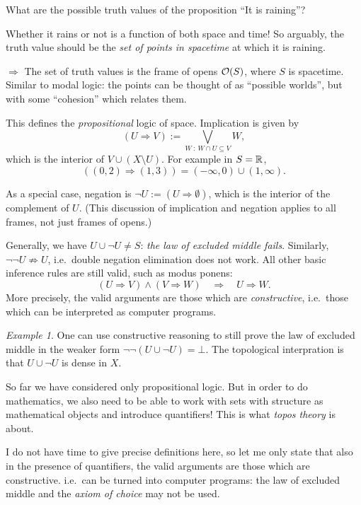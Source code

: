\documentclass[11pt, oneside, article]{memoir}
\theoremstyle{plain}
\theoremstyle{definition}
\theoremstyle{remark}
\newtheorem{example}[theorem]{Example}
\begin{document}
What are the possible truth values of the proposition ``It is raining''?

Whether it rains or not is a function of both space and time! So arguably, the truth value should be the \emph{set of points in spacetime} at which it is raining. 

$\Rightarrow$ The set of truth values is the frame of opens $\mathcal{O}(S)$, where $S$ is spacetime. Similar to modal logic: the points can be thought of as ``possible worlds'', but with some ``cohesion'' which relates them.

This defines the \emph{propositional} logic of space. Implication is given by
\[
	(U \Rightarrow V) := \bigvee_{W \: : \: W \cap U \subseteq V} W,
\]
which is the interior of $V\cup (X\setminus U)$. For example in $S = \mathbb{R}$,
\[
	((0,2) \Rightarrow (1,3)) = (-\infty, 0) \cup (1,\infty).
\]

As a special case, negation is $\lnot U := (U \Rightarrow \emptyset)$, which is the interior of the complement of $U$. (This discussion of implication and negation applies to all frames, not just frames of opens.)

Generally, we have $U \cup \lnot U \neq S$: \emph{the law of excluded middle fails}. Similarly, $\lnot\lnot U \not\Rightarrow U$, i.e.~double negation elimination does not work. All other basic inference rules are still valid, such as modus ponens: 
\[
	(U \Rightarrow V) \land (V\Rightarrow W) \quad \Rightarrow \quad U \Rightarrow W.
\]
More precisely, the valid arguments are those which are \emph{constructive}, i.e.~those which can be interpreted as computer programs.

\begin{example}
One can use constructive reasoning to still prove the law of excluded middle in the weaker form $\lnot\lnot(U \cup \lnot U) = \bot$. The topological interpration is that $U \cup \lnot U$ is dense in $X$.
\end{example}

So far we have considered only propositional logic. But in order to do mathematics, we also need to be able to work with sets with structure as mathematical objects and introduce quantifiers! This is what \emph{topos theory} is about.

I do not have time to give precise definitions here, so let me only state that also in the presence of quantifiers, the valid arguments are those which are constructive. i.e.~can be turned into computer programs: the law of excluded middle and the \emph{axiom of choice} may not be used.
\end{document}
